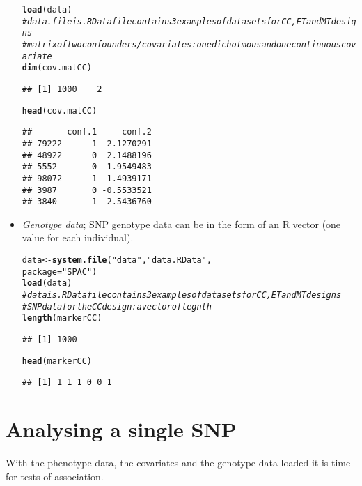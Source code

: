 \documentclass{article}\usepackage[]{graphicx}\usepackage[]{color}
\makeatletter
\newcommand{\hlstr}[1]{\textcolor[rgb]{0.192,0.494,0.8}{#1}}%
\newcommand{\hlcom}[1]{\textcolor[rgb]{0.678,0.584,0.686}{\textit{#1}}}%
\newcommand{\hlstd}[1]{\textcolor[rgb]{0.345,0.345,0.345}{#1}}%
\newcommand{\hlkwb}[1]{\textcolor[rgb]{0.69,0.353,0.396}{#1}}%
\newcommand{\hlkwc}[1]{\textcolor[rgb]{0.333,0.667,0.333}{#1}}%
\newcommand{\hlkwd}[1]{\textcolor[rgb]{0.737,0.353,0.396}{\textbf{#1}}}%
\newenvironment{kframe}{%
 \def\at@end@of@kframe{}%
 \ifinner\ifhmode%
  \def\at@end@of@kframe{\end{minipage}}%
  \begin{minipage}{\columnwidth}%
 \fi\fi%
 \def\FrameCommand##1{\hskip\@totalleftmargin \hskip-\fboxsep
 \colorbox{shadecolor}{##1}\hskip-\fboxsep
     \hskip-\linewidth \hskip-\@totalleftmargin \hskip\columnwidth}%
 \MakeFramed {\advance\hsize-\width
   \@totalleftmargin\z@ \linewidth\hsize
   \@setminipage}}%
 {\par\unskip\endMakeFramed%
 \at@end@of@kframe}
\newenvironment{knitrout}{}{} %
\makeatother
\begin{document}
\begin{itemize}
\begin{knitrout}
\begin{kframe}
\begin{alltt}
  \hlkwd{load}\hlstd{(data)}
\hlcom{# data.file is .RData file contains 3 examples of data sets for CC, ET and MT designs}
\hlcom{# matrix of two confounders/covariates: one dichotmous and one continuous covariate}
  \hlkwd{dim}\hlstd{(cov.matCC)}
\end{alltt}
\begin{verbatim}
## [1] 1000    2
\end{verbatim}
\begin{alltt}
  \hlkwd{head}\hlstd{(cov.matCC)}
\end{alltt}
\begin{verbatim}
##       conf.1     conf.2
## 79222      1  2.1270291
## 48922      0  2.1488196
## 5552       0  1.9549483
## 98072      1  1.4939171
## 3987       0 -0.5533521
## 3840       1  2.5436760
\end{verbatim}
\end{kframe}
\end{knitrout}
\item \emph{Genotype data}; SNP genotype data can be in the form of
  an R vector (one value for each individual).
\begin{knitrout}
\color{fgcolor}\begin{kframe}
\begin{alltt}
  \hlstd{data} \hlkwb{<-} \hlkwd{system.file}\hlstd{(}\hlstr{"data"}\hlstd{,} \hlstr{"data.RData"}\hlstd{,}
                         \hlkwc{package}\hlstd{=}\hlstr{"SPAC"}\hlstd{)}
  \hlkwd{load}\hlstd{(data)}
\hlcom{# data is .RData file contains 3 examples of data sets for CC, ET and MT designs}
\hlcom{# SNP data for the CC design: a vector of legnth}
  \hlkwd{length}\hlstd{(markerCC)}
\end{alltt}
\begin{verbatim}
## [1] 1000
\end{verbatim}
\begin{alltt}
  \hlkwd{head}\hlstd{(markerCC)}
\end{alltt}
\begin{verbatim}
## [1] 1 1 1 0 0 1
\end{verbatim}
\end{kframe}
\end{knitrout}
\end{itemize}

\section{Analysing a single SNP}
\label{sec:analys-single-SNP}
With the phenotype data, the covariates and the genotype data loaded it is time for tests of association.
\end{document}
